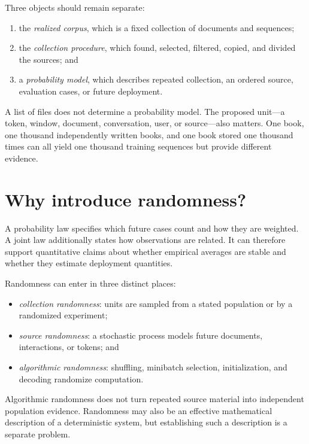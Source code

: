\documentclass[11pt,twoside]{article}
\theoremstyle{definition}
\theoremstyle{remark}
\begin{document}
Three objects should remain separate:
\begin{enumerate}[leftmargin=*]
\item the \emph{realized corpus}, which is a fixed collection of documents and
  sequences;
\item the \emph{collection procedure}, which found, selected, filtered,
  copied, and divided the sources; and
\item a \emph{probability model}, which describes repeated collection, an
  ordered source, evaluation cases, or future deployment.
\end{enumerate}
A list of files does not determine a probability model. The proposed unit---a
token, window, document, conversation, user, or source---also matters. One book,
one thousand independently written books, and one book stored one thousand
times can all yield one thousand training sequences but provide different
evidence.

\section{Why introduce randomness?}
\label{sec:randomness}

A probability law specifies which future cases count and how they are
weighted. A joint law additionally states how observations are related. It can
therefore support quantitative claims about whether empirical averages are
stable and whether they estimate deployment quantities.

Randomness can enter in three distinct places:
\begin{itemize}[leftmargin=*]
\item \emph{collection randomness}: units are sampled from a stated
  population or by a randomized experiment;
\item \emph{source randomness}: a stochastic process models future documents,
  interactions, or tokens; and
\item \emph{algorithmic randomness}: shuffling, minibatch selection,
  initialization, and decoding randomize computation.
\end{itemize}
Algorithmic randomness does not turn repeated source material into independent
population evidence. Randomness may also be an effective mathematical
description of a deterministic system, but establishing such a description is
a separate problem.\label{en:deterministic-randomness}
\end{document}
